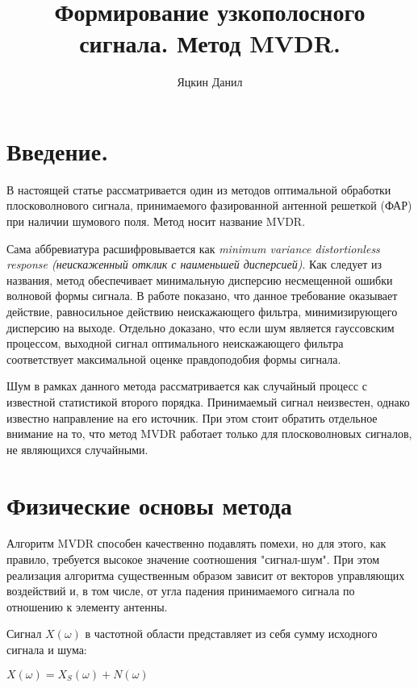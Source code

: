 \documentclass{article}
\title{Формирование узкополосного сигнала. Метод MVDR.}
\author{Яцкин Данил}
\begin{document}
\maketitle

\section{Введение.}
 
В настоящей  статье рассматривается один из методов оптимальной обработки плосковолнового сигнала, принимаемого фазированной антенной решеткой (ФАР) при наличии шумового поля. Метод носит название MVDR.
 
Сама аббревиатура расшифровывается как \textit{minimum variance distortionless response (неискаженный отклик с наименьшей дисперсией)}. Как следует из названия, метод обеспечивает минимальную дисперсию несмещенной ошибки  волновой формы сигнала. В работе \cite{Trees2002} показано, что данное требование оказывает действие, равносильное действию неискажающего фильтра, минимизирующего дисперсию на выходе. Отдельно доказано, что если шум является гауссовским процессом, выходной сигнал оптимального неискажающего фильтра соответствует максимальной оценке правдоподобия формы сигнала.

Шум в рамках данного метода рассматривается как случайный процесс с известной статистикой второго порядка. Принимаемый сигнал неизвестен, однако известно направление на его источник. При этом стоит обратить отдельное внимание на то, что метод MVDR работает только для плосковолновых сигналов, не являющихся случайными.






\section{Физические основы метода}

Алгоритм MVDR способен качественно подавлять помехи, но для этого, как правило, требуется высокое значение соотношения "сигнал-шум". При этом реализация алгоритма существенным образом зависит от векторов управляющих воздействий и, в том числе, от угла падения принимаемого сигнала по отношению к элементу антенны.

Сигнал $X(\omega)$ в частотной области представляет из себя сумму исходного сигнала и шума:

\begin{center}
$X(\omega) = X_{S}(\omega) + N(\omega)$
\end{center}
\end{document}

